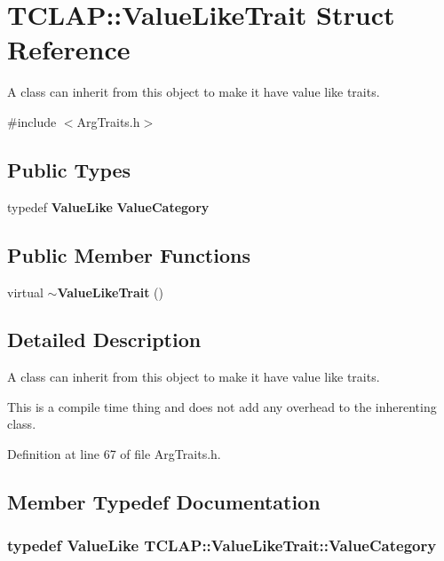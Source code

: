 \section{T\+C\+L\+A\+P\+:\+:Value\+Like\+Trait Struct Reference}
\label{structTCLAP_1_1ValueLikeTrait}


A class can inherit from this object to make it have value like traits.  




{\ttfamily \#include $<$Arg\+Traits.\+h$>$}

\subsection*{Public Types}
\begin{DoxyCompactItemize}
\item 
typedef {\bf Value\+Like} {\bf Value\+Category}
\end{DoxyCompactItemize}
\subsection*{Public Member Functions}
\begin{DoxyCompactItemize}
\item 
virtual {\bf $\sim$\+Value\+Like\+Trait} ()
\end{DoxyCompactItemize}


\subsection{Detailed Description}
A class can inherit from this object to make it have value like traits. 

This is a compile time thing and does not add any overhead to the inherenting class. 

Definition at line 67 of file Arg\+Traits.\+h.



\subsection{Member Typedef Documentation}
\subsubsection[{Value\+Category}]{\setlength{\rightskip}{0pt plus 5cm}typedef {\bf Value\+Like} {\bf T\+C\+L\+A\+P\+::\+Value\+Like\+Trait\+::\+Value\+Category}}\label{structTCLAP_1_1ValueLikeTrait_aac4ee14f65926b8e741d797a8900a79a}


